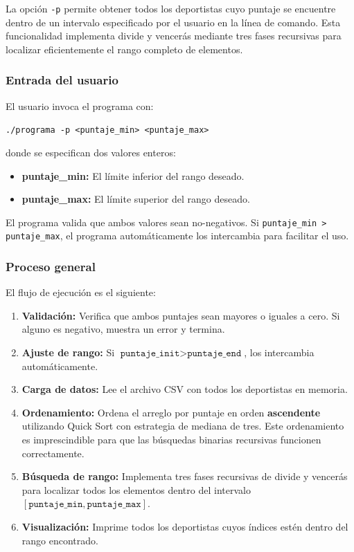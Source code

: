 La opción \texttt{-p} permite obtener todos los deportistas cuyo puntaje se encuentre dentro de un intervalo especificado por el usuario en la línea de comando. Esta funcionalidad implementa divide y vencerás mediante tres fases recursivas para localizar eficientemente el rango completo de elementos.

\subsubsection{Entrada del usuario}

El usuario invoca el programa con:

\texttt{./programa -p \textless{}puntaje\_min\textgreater{} \textless{}puntaje\_max\textgreater{}}

donde se especifican dos valores enteros:

\begin{itemize}
    \item \textbf{puntaje\_min:} El límite inferior del rango deseado.
    \item \textbf{puntaje\_max:} El límite superior del rango deseado.
\end{itemize}

El programa valida que ambos valores sean no-negativos. Si \texttt{puntaje\_min > puntaje\_max}, el programa automáticamente los intercambia para facilitar el uso.

\subsubsection{Proceso general}

El flujo de ejecución es el siguiente:

\begin{enumerate}
    \item \textbf{Validación:} Verifica que ambos puntajes sean mayores o iguales a cero. Si alguno es negativo, muestra un error y termina.
    
    \item \textbf{Ajuste de rango:} Si \(\texttt{puntaje\_init} > \texttt{puntaje\_end}\), los intercambia automáticamente.
    
    \item \textbf{Carga de datos:} Lee el archivo CSV con todos los deportistas en memoria.
    
    \item \textbf{Ordenamiento:} Ordena el arreglo por puntaje en orden \textbf{ascendente} utilizando Quick Sort con estrategia de mediana de tres. Este ordenamiento es imprescindible para que las búsquedas binarias recursivas funcionen correctamente.
    
    \item \textbf{Búsqueda de rango:} Implementa tres fases recursivas de divide y vencerás para localizar todos los elementos dentro del intervalo \([\texttt{puntaje\_min}, \texttt{puntaje\_max}]\).
    
    \item \textbf{Visualización:} Imprime todos los deportistas cuyos índices estén dentro del rango encontrado.
\end{enumerate}

